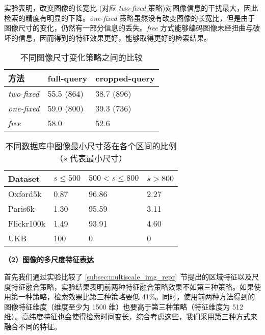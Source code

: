 实验表明，改变图像的长宽比 (对应 \emph{two-fixed} 策略)对图像信息的干扰最大，因此检索的精度有明显的下降。\emph{one-fixed} 策略虽然没有改变图像的长宽比，但是由于图像尺寸的变化，仍然有一部分信息的丢失。\emph{free} 方式能够编码图像未经扭曲与破坏的信息，因而得到的特征效果更好，能够取得更好的检索结果。

\begin{table}[!t]
	\centering
	\caption{不同图像尺寸变化策略之间的比较}
	\label{table:image_size_impact}
	\begin{tabular}{lll}
		\toprule
		方法		    & full-query			& cropped-query \\
		\midrule
		\emph{two-fixed}		&		55.5 (864)		& 	38.7 (896)	\\
		\emph{one-fixed}		&		59.0 (800) 		&	39.3 (736)\\
		\emph{free}				&		58.0	 		&	52.6 	\\
		\bottomrule
	\end{tabular}
\end{table}

\begin{table}[!t]
	\centering
	\caption{不同数据库中图像最小尺寸落在各个区间的比例（$s$ 代表最小尺寸）}
	\label{table:min_size_distribution}
	\begin{tabular}{llll}
		\toprule
		Dataset & $s\leq 500$ & $500<s\leq 800$&  $s>800$ \\
		\midrule
		Oxford5k & 0.87 & 96.86 & 2.27 \\
		Paris6k & 1.30  & 95.59 & 3.11 \\
		Flickr100k & 1.49 & 93.91 & 4.60\\
		UKB & 100 & 0 & 0 \\
		\bottomrule
	\end{tabular}
	\end{table}

\noindent\textbf{（2）图像的多尺度特征表达}

首先我们通过实验比较了 \ref{subsec:multiscale_img_repr}~节提出的区域特征以及尺度特征融合策略，实验结果表明前两种特征融合策略效果不如第三种策略。如果使用第一种策略，检索效果比第三种策略要低 41\%。同时，使用前两种方法得到的图像特征维度（维度至少为 1500 维）也要高于第三种策略（特征维度为 512 维）。高纬度特征也会使得检索时间变长，综合考虑这些，我们采用第三种方式来融合不同的特征。

